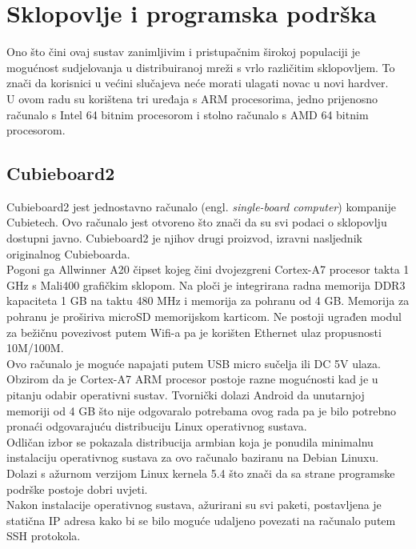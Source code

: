 \documentclass[times, utf8, zavrsni, numeric]{fer}
\begin{document}
\section{Sklopovlje i programska podrška}
Ono što čini ovaj sustav zanimljivim i pristupačnim širokoj populaciji je mogućnost sudjelovanja u distribuiranoj mreži s vrlo
različitim sklopovljem. To znači da korisnici u većini slučajeva neće morati ulagati novac u novi hardver.\\ U ovom radu su korištena
tri uređaja s ARM procesorima, jedno prijenosno računalo s Intel 64 bitnim procesorom i stolno računalo s AMD 64 bitnim procesorom.
\subsection{Cubieboard2}
Cubieboard2 jest jednostavno računalo (engl. \emph{single-board computer}) kompanije Cubietech. Ovo računalo jest otvoreno
što znači da su svi podaci o sklopovlju dostupni javno. Cubieboard2 je njihov drugi proizvod, izravni nasljednik originalnog Cubieboarda.\\
Pogoni ga Allwinner A20 čipset kojeg čini dvojezgreni Cortex-A7 procesor takta 1 GHz s Mali400 grafičkim sklopom. 
Na ploči je integrirana radna memorija DDR3 kapaciteta 1 GB na taktu 480 MHz i memorija za pohranu od 4 GB. Memorija za pohranu je 
proširiva microSD memorijskom karticom.
Ne postoji ugrađen modul za bežičnu povezivost putem Wifi-a pa je korišten Ethernet ulaz propusnosti 10M/100M. \\
Ovo računalo je moguće napajati putem USB micro sučelja ili DC 5V ulaza. \\
Obzirom da je Cortex-A7 ARM procesor postoje razne mogućnosti kad je u pitanju odabir operativni sustav. Tvornički dolazi
Android da unutarnjoj memoriji od 4 GB što nije odgovaralo potrebama ovog rada pa je bilo potrebno pronaći odgovarajuću distribuciju
Linux operativnog sustava.\\ Odličan izbor se pokazala distribucija armbian koja je ponudila minimalnu instalaciju operativnog sustava
za ovo računalo baziranu na Debian Linuxu. Dolazi s ažurnom verzijom Linux kernela 5.4 što znači da sa strane programske podrške
postoje dobri uvjeti. \\
Nakon instalacije operativnog sustava, ažurirani su svi paketi, postavljena je statična IP adresa kako bi se bilo moguće udaljeno
povezati na računalo putem SSH protokola. 
\end{document}
